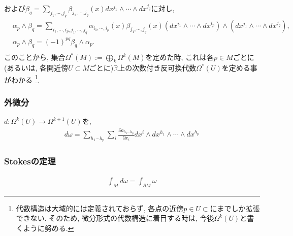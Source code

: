 および$\beta_q = \sum_{j_1, \cdots, j_q}\beta_{j_1, \cdots, j_q}(x)dx^{j_1}\wedge \cdots \wedge dx^{j_q}$に対し, 
\begin{align}
    &\alpha_p \wedge \beta_q = \sum_{i_1, \cdots, i_p, j_1, \cdots, j_q}\alpha_{i_1, \cdots, i_p}(x)\beta_{j_1, \cdots, j_q}(x)(dx^{i_1}\wedge \cdots \wedge dx^{i_p})\wedge (dx^{j_1}\wedge \cdots \wedge dx^{j_q}), \\
    &\alpha_p \wedge \beta_q = (-1)^{pq}\beta_q \wedge \alpha_p. \\
\end{align}
このことから, 集合$\Omega^{*}(M):=\bigoplus_{k}\Omega^{k}(M)$を定めた時, これは各$p\in M$ごとに(あるいは, 各開近傍$U\subset M$ごとに)$\mathbb{R}$上の次数付き反可換代数$\Omega^{*}(U)$を定める事がわかる
\footnote{代数構造は大域的には定義されておらず, 各点の近傍$p\in U\subset $にまでしか拡張できない. 
そのため, 微分形式の代数構造に着目する時は, 今後$\Omega^{k}(U)$と書くように努める. }. \\
\subsubsection{外微分}
$d: \Omega^{k}(U)\to \Omega^{k+1}(U)$を, 
\begin{align}
    d\omega 
    = \sum_{h_1\cdots h_p}\sum_{i} \frac{\partial a_{h_1\cdots h_p}}{\partial x_i}dx^{i}\wedge dx^{h_1}\wedge \cdots \wedge dx^{h_p}
\end{align}
\subsubsection{Stokesの定理}
\begin{align}
    \int_{M}d\omega = \int_{\partial M}\omega
\end{align}
